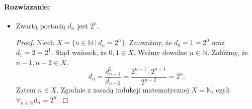 \documentclass{article}
\newenvironment{rozw}{\paragraph{Rozwiazanie:}}{\hfill}
\begin{document}
\begin{rozw}
\begin{itemize}
\item Zwartą postacią $d_n$ jest $2^n$.

\begin{proof}
Niech $X = \lbrace n \in \mathbb{N} \ | \ d_n = 2^n \rbrace$. Zauważmy, że $d_0 = 1 = 2^0$ oraz $d_1 = 2 = 2^1$. Stąd wniosek, że $0,1 \in X$. Weźmy dowolne $n \in \mathbb{N}$. Załóżmy, że $n-1, n-2 \in X$. $$d_n = \frac{d_{n-1}^2}{d_{n-2}} = \frac{2^{n-1} \cdot 2^{n-1}}{2^{n-2}} = 2^n.$$
Zatem $n \in X$. Zgodnie z zasadą indukcji matematycznej $X = \mathbb{N}$, czyli $\forall_{n \in \mathbb{N}} d_n = 2^n$.
\end{proof}

\end{itemize}

\end{rozw}

\end{document}

